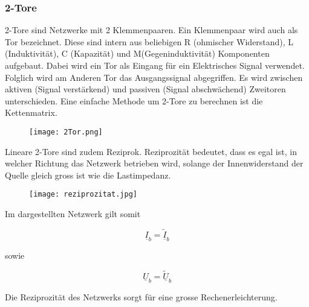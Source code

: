  \subsubsection{2-Tore} \label{subsubsec:2tore}
  
2-Tore sind Netzwerke mit 2 Klemmenpaaren. Ein Klemmenpaar wird auch als Tor bezeichnet. Diese sind intern aus beliebigen R (ohmischer Widerstand), L (Induktivität), C (Kapazität) und M(Gegeninduktivität) Komponenten aufgebaut. Dabei wird ein Tor als Eingang für ein Elektrisches Signal verwendet. Folglich wird am Anderen Tor das Ausgangssignal abgegriffen. Es wird zwischen aktiven (Signal verstärkend) und passiven (Signal abschwächend) Zweitoren unterschieden. Eine einfache Methode um 2-Tore zu berechnen ist die Kettenmatrix. 

\begin{figure}[H]
	\centering
	\texttt{[image: 2Tor.png]}
	\label{fig:2tor}
\end{figure}

Lineare 2-Tore sind zudem Reziprok. Reziprozität bedeutet, dass es egal ist, in welcher Richtung das Netzwerk betrieben wird, solange der Innenwiderstand der Quelle gleich gross ist wie  die Lastimpedanz.

\begin{figure}[H]
	\centering
	\texttt{[image: reziprozitat.jpg]}
	\label{fig:reziprozitat}
\end{figure}

Im dargestellten Netzwerk gilt somit

\begin{equation}\label{equ:verticImpedance}
			\underline{I}_b =  \underline{\tilde{I}}_b
		\end{equation}
		
sowie 		
		
\begin{equation}\label{equ:verticImpedance}
			\underline{U}_b =  \underline{\widetilde{U}}_b
		\end{equation}
		
Die Reziprozität des Netzwerks sorgt für eine grosse Rechenerleichterung.
